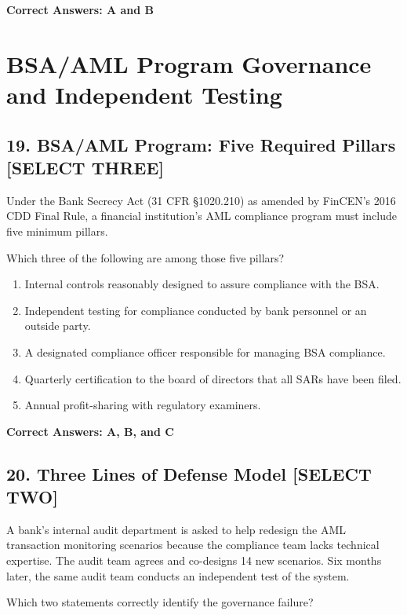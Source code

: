 \documentclass[11pt,a4paper]{article}
\begin{document}
	\textbf{Correct Answers: A and B}
	
	\section{BSA/AML Program Governance and Independent Testing}
	
	\subsection{19. BSA/AML Program: Five Required Pillars \textnormal{[SELECT THREE]}}
	
	Under the Bank Secrecy Act (31 CFR \S 1020.210) as amended by FinCEN's 2016 CDD Final Rule, a financial institution's AML compliance program must include five minimum pillars.
	
	Which three of the following are among those five pillars?
	
	\begin{enumerate}[label=\Alph*.]
		\item Internal controls reasonably designed to assure compliance with the BSA.
		\item Independent testing for compliance conducted by bank personnel or an outside party.
		\item A designated compliance officer responsible for managing BSA compliance.
		\item Quarterly certification to the board of directors that all SARs have been filed.
		\item Annual profit-sharing with regulatory examiners.
	\end{enumerate}
	
	\textbf{Correct Answers: A, B, and C}
	
	\subsection{20. Three Lines of Defense Model \textnormal{[SELECT TWO]}}
	
	A bank's internal audit department is asked to help redesign the AML transaction monitoring scenarios because the compliance team lacks technical expertise. The audit team agrees and co-designs 14 new scenarios. Six months later, the same audit team conducts an independent test of the system.
	
	Which two statements correctly identify the governance failure?
	
\end{document}
